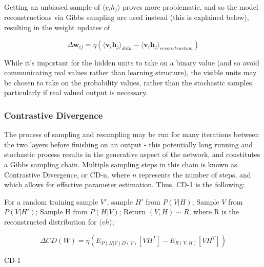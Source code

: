 \documentclass[a4paper,11pt,oneside]{article}
\theoremstyle{plain}
\theoremstyle{definition}
\begin{document}
Getting an unbiased sample of $\langle v_i h_j \rangle$ proves more problematic, and so the model reconstructions via Gibbs sampling are used instead (this is explained below), resulting in the weight updates of

\begin{equation}
\Delta \mathbf{w}_{ij} = \eta (\langle \mathbf{v}_i\mathbf{h}_j\rangle_{data} - \langle \mathbf{v}_i\mathbf{h}_j\rangle_{reconstruction})
\end{equation}

While it's important for the hidden units to take on a binary value (and so avoid communicating real values rather than learning structure), the visible units may be chosen to take on the probability values, rather than the stochastic samples, particularly if real valued output is necessary. 

\subsubsection{Contrastive Divergence}\label{imp_CD}

The process of sampling and resampling may be run for many iterations between the two layers before finishing on an output - this potentially long running and stochastic process results in the generative aspect of the network, and constitutes a Gibbs sampling chain. Multiple sampling steps in this chain is known as Contrastive Divergence, or CD-n, where $n$ represents the number of steps, and which allows for effective parameter estimation. Thus, CD-1 is the following:\newline


\begin{algorithm}[H]
	
	\texttt{}\newline
	
	For a random training sample $V'$, sample $H'$ from $P(V|H)$;\newline
	Sample $V$ from $P(V|H')$;\newline
	Sample H from $P(H|V)$;\newline
	Return $(V,H) \sim R $, where R is the reconstructed distribution for $\langle vh \rangle$;\newline
	
	 
	\begin{equation}
	\Delta CD(W) = \eta( E_{P(H|V)D(V)}[VH^T] - E_{R(V,H)}[VH^T])
	\end{equation}
	
	
	
	\label{algo_cd1}
	\caption{CD-1}
\end{algorithm}
\end{document}
